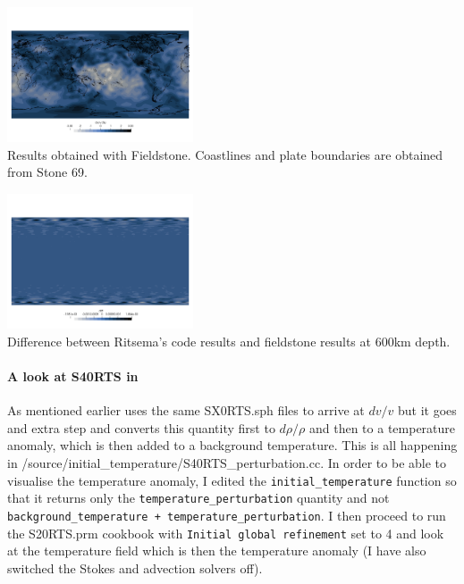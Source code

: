 \begin{center}
\includegraphics[width=5.5cm]{python_codes/fieldstone_85/images/fieldstone/fieldstone_S40RTS_2891km.png}\\
{\captionfont Results obtained with Fieldstone. Coastlines and plate boundaries are obtained from Stone 69.}
\end{center}

\begin{center}
\includegraphics[width=5.5cm]{python_codes/fieldstone_85/images/fieldstone/diff_600km_S40RTS.png}\\
{\captionfont Difference between Ritsema's code results and fieldstone results at 600\si{km} depth.}
\end{center}

\newpage
\paragraph{A look at S40RTS in \aspect} As mentioned earlier \aspect{} uses 
the same {\filenamefont SX0RTS.sph} files to arrive at $dv/v$ but it goes and extra 
step and converts this quantity first to $d\rho/\rho$ and then to a temperature 
anomaly, which is then added to a background temperature.
This is all happening in {\filenamefont /source/initial\_temperature/S40RTS\_perturbation.cc}.
In order to be able to visualise the temperature anomaly, I 
edited the \texttt{initial\_temperature} function so that it returns only the 
\texttt{temperature\_perturbation} quantity and not \texttt{background\_temperature + temperature\_perturbation}.
I then proceed to run the {\filenamefont S20RTS.prm} cookbook with \texttt{Initial global refinement} set to 4
and look at the temperature field which is then 
the temperature anomaly (I have also switched the Stokes and advection solvers off).


